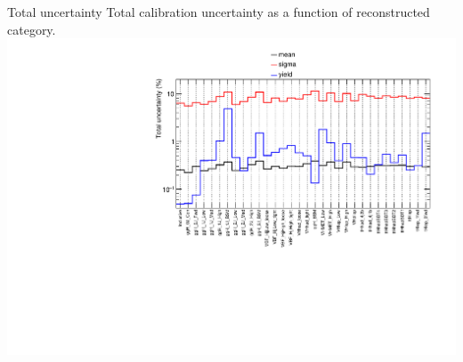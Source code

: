 \begin{frame}{Total uncertainty}
  \centering
  Total calibration uncertainty as a function of reconstructed category.\\
\includegraphics[width=0.9\linewidth]{Figures/h015d_FULLMerge_catMerge_Systematics_InclusiveUp.pdf}  
\end{frame}

